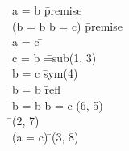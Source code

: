 \documentclass{article}
\begin{document}
\begin{proofbox}
\: a = b \= \hbox{premise} \\
\: \lnot (b = b \land b = c) \= \hbox{premise} \\
\open
\: a = c \= \asm \\
\: c = b \= =\hbox{sub}(1, 3) \\
\: b = c \= sym(4) \\
\: b = b \= \hbox{refl} \\
\: b = b \land b = c \= \andintro(6, 5) \\
\: \bot \= \notelim(2, 7) \\
\close
\: \lnot (a = c) \= \notintro(3, 8) \\
\end{proofbox}
\end{document}
